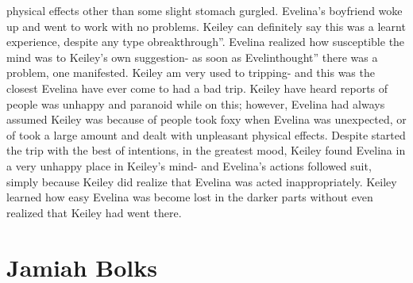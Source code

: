 \documentclass[12pt]{book}
\begin{document}
physical effects other than some slight stomach gurgled. Evelina's boyfriend woke up and went to work with no problems. Keiley can definitely say this was a learnt experience, despite any type obreakthrough''. Evelina realized how susceptible the mind was to Keiley's own suggestion- as soon as Evelinthought'' there was a problem, one manifested. Keiley am very used to tripping- and this was the closest Evelina have ever come to had a bad trip. Keiley have heard reports of people was unhappy and paranoid while on this; however, Evelina had always assumed Keiley was because of people took foxy when Evelina was unexpected, or of took a large amount and dealt with unpleasant physical effects. Despite started the trip with the best of intentions, in the greatest mood, Keiley found Evelina in a very unhappy place in Keiley's mind- and Evelina's actions followed suit, simply because Keiley did realize that Evelina was acted inappropriately. Keiley learned how easy Evelina was become lost in the darker parts without even realized that Keiley had went there.



\chapter{Jamiah Bolks}
\end{document}
